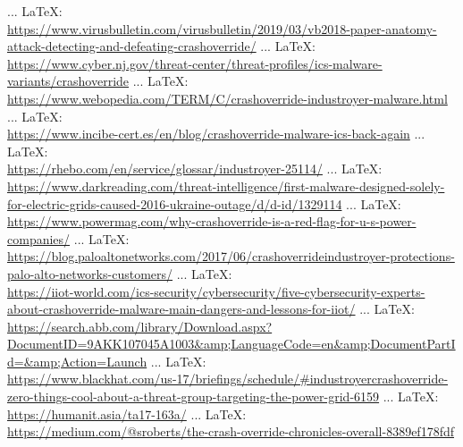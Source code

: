 \begin{thebibliography}{99}
{{{			 ... \LaTeX:\\ \url{https://www.virusbulletin.com/virusbulletin/2019/03/vb2018-paper-anatomy-attack-detecting-and-defeating-crashoverride/}
			 ... \LaTeX:\\ \url{https://www.cyber.nj.gov/threat-center/threat-profiles/ics-malware-variants/crashoverride}
			 ... \LaTeX:\\ \url{https://www.webopedia.com/TERM/C/crashoverride-industroyer-malware.html}
			 ... \LaTeX:\\ \url{https://www.incibe-cert.es/en/blog/crashoverride-malware-ics-back-again}
			 ... \LaTeX:\\ \url{https://rhebo.com/en/service/glossar/industroyer-25114/}
			 ... \LaTeX:\\ \url{https://www.darkreading.com/threat-intelligence/first-malware-designed-solely-for-electric-grids-caused-2016-ukraine-outage/d/d-id/1329114}
			 ... \LaTeX:\\ \url{https://www.powermag.com/why-crashoverride-is-a-red-flag-for-u-s-power-companies/}
			 ... \LaTeX:\\ \url{https://blog.paloaltonetworks.com/2017/06/crashoverrideindustroyer-protections-palo-alto-networks-customers/}
			 ... \LaTeX:\\ \url{https://iiot-world.com/ics-security/cybersecurity/five-cybersecurity-experts-about-crashoverride-malware-main-dangers-and-lessons-for-iiot/}
			 ... \LaTeX:\\ \url{https://search.abb.com/library/Download.aspx?DocumentID=9AKK107045A1003&amp;LanguageCode=en&amp;DocumentPartId=&amp;Action=Launch}
			 ... \LaTeX:\\ \url{https://www.blackhat.com/us-17/briefings/schedule/#industroyercrashoverride-zero-things-cool-about-a-threat-group-targeting-the-power-grid-6159}
			 ... \LaTeX:\\ \url{https://humanit.asia/ta17-163a/}
			 ... \LaTeX:\\ \url{https://medium.com/@sroberts/the-crash-override-chronicles-overall-8389ef178fdf}
}}}
\end{thebibliography}
